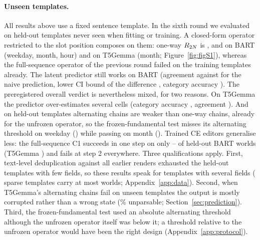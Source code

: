\paragraph{Unseen templates.}
All results above use a fixed sentence template. In the sixth round we evaluated on held-out templates never seen when fitting or
training. A closed-form operator restricted to the slot position composes on them: one-way $R_{2N}$ is \CLfourteenBaseWeekday{},
\CLfourteenBaseMonth{} and \CLfourteenBaseHour{} on BART (weekday, month, hour) and \CLfourteenBaseTfive{} on T5Gemma (month; Figure~\ref{fig:figS1}), whereas
the full-sequence operator of the previous round failed on the training templates already. The latent predictor still works on BART
(agreement \CLfourteenAgreeBart{} against \CLfourteenNaiveBart{} for the naive prediction, lower CI bound of the difference
\CLfourteenDiffLoBart{}, category accuracy \CLfourteenCatBart{}). The preregistered overall verdict is nevertheless mixed, for two
reasons. On T5Gemma the predictor over-estimates several cells (category accuracy \CLfourteenCatTfive{}, agreement
\CLfourteenAgreeTfive{}). And on held-out templates alternating chains are weaker than one-way chains, already for the unfrozen
operator, so the frozen-fundamental test misses its alternating threshold on weekday (\CLfourteenFoneAltWeekday{}) while passing on
month (\CLfourteenFoneAltMonth{}). Trained CE editors generalise less: the full-sequence C1 succeeds in one step on only
\CLfourteenConeRoneWeekday{}--\CLfourteenConeRoneHour{} of held-out BART worlds (T5Gemma \CLfourteenConeRoneTfive{}) and fails at
step 2 everywhere. Three qualifications apply. First, text-level deduplication against all earlier renders exhausted the held-out
templates with few fields, so these results speak for templates with several fields (\CLfourteenTmplSparse{} sparse templates carry at
most \CLfourteenTmplSparseMax{} worlds; Appendix~\ref{app:data}). Second, when T5Gemma's alternating chains fail on unseen templates the
output is mostly corrupted rather than a wrong state (\CLfifteenUnparsable{}\% unparsable; Section~\ref{sec:prediction}). Third, the
frozen-fundamental test used an absolute alternating threshold although the unfrozen operator itself was below it; a threshold relative
to the unfrozen operator would have been the right design (Appendix~\ref{app:protocol}).

